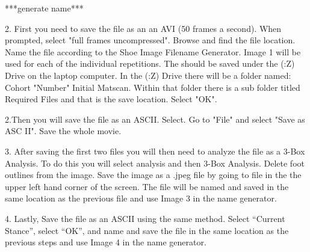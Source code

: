 ***generate name***

2. First you need to save the file as an an AVI (50 frames a second). When prompted, select "full frames uncompressed". Browse and find the file location. Name the file according to the Shoe Image Filename Generator. Image 1 will be used for each of the individual repetitions. The should be saved under the (:Z) Drive on the laptop computer. In the (:Z) Drive there will be a folder named: Cohort "Number" Initial Matscan. Within that folder there is a sub folder titled Required Files and that is the save location.  Select "OK". 

2.Then you will save the file as an ASCII. Select. Go to "File"  and select "Save as ASC II". Save the whole movie. 

3. After saving the first two files you will then need to analyze the file as a 3-Box Analysis. To do this you will select analysis and then 3-Box Analysis. Delete foot outlines from the image. Save the image as a .jpeg file by going to file in the the upper left hand corner of the screen.  The file will be named and saved in the same location as the previous file and use Image 3 in the name generator. 


4. Lastly, Save the file as an ASCII using the same method. Select ``Current Stance'', select ``OK'', and name and save the file in the same location as the previous steps and use Image 4 in the name generator. 

 



